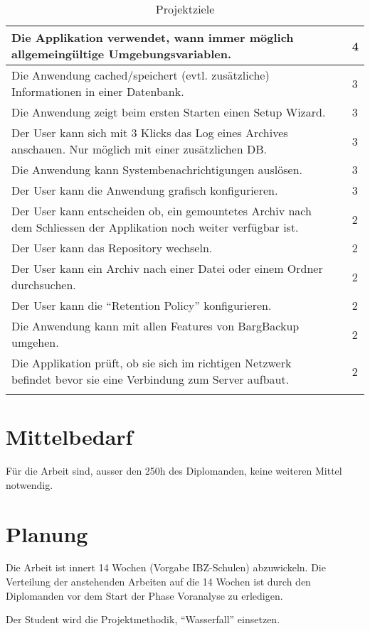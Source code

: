 \begin{longtable}{|p{9cm}|p{1.5cm}|p{2cm}|}
\hline
Die Applikation verwendet, wann immer möglich allgemeingültige Umgebungsvariablen. &  & 4\\
\hline
Die Anwendung cached/speichert (evtl. zusätzliche) Informationen in einer Datenbank. &  & 3\\
\hline
Die Anwendung zeigt beim ersten Starten einen Setup Wizard. &  & 3\\
\hline
Der User kann sich mit 3 Klicks das Log eines Archives anschauen. Nur möglich mit einer zusätzlichen DB. &  & 3\\
\hline
Die Anwendung kann Systembenachrichtigungen auslösen. &  & 3\\
\hline
Der User kann die Anwendung grafisch konfigurieren. &  & 3\\
\hline
Der User kann entscheiden ob, ein gemountetes Archiv nach dem Schliessen der Applikation noch weiter verfügbar ist. &  & 2\\
\hline
Der User kann das Repository wechseln. &  & 2\\
\hline
Der User kann ein Archiv nach einer Datei oder einem Ordner durchsuchen. &  & 2\\
\hline
Der User kann die "`Retention Policy"' konfigurieren. &  & 2\\
\hline
Die Anwendung kann mit allen Features von BargBackup umgehen. &  & 2\\
\hline
Die Applikation prüft, ob sie sich im richtigen Netzwerk befindet bevor sie eine Verbindung zum Server aufbaut. &  & 2\\
\hline
\caption{\label{tab:org7e8f332}
Projektziele}
\\
\end{longtable}
\newpage
\section{Mittelbedarf}
\label{sec:orgf773869}
Für die Arbeit sind, ausser den 250h des Diplomanden, keine weiteren Mittel
notwendig.

\section{Planung}
\label{sec:org18ba744}

Die Arbeit ist innert 14 Wochen (Vorgabe IBZ-Schulen) abzuwickeln. Die
Verteilung der anstehenden Arbeiten auf die 14 Wochen ist durch den Diplomanden
vor dem Start der Phase Voranalyse zu erledigen.

Der Student wird die Projektmethodik, "`Wasserfall"' einsetzen.

